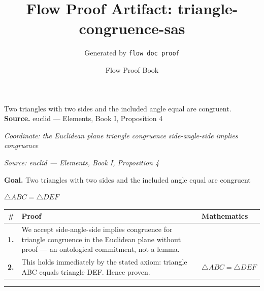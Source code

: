 \documentclass[11pt]{article}
\title{Flow Proof Artifact: triangle-congruence-sas}
\author{Generated by \texttt{flow doc proof}}
\date{Flow Proof Book}
\theoremstyle{definition}
\begin{document}
\maketitle
Two triangles with two sides and the included angle equal are congruent.\\[0.5em]
\textbf{Source.} euclid — Elements, Book I, Proposition 4\\[0.5em]
\bigskip
{}\par
\smallskip\noindent\textit{Coordinate: the Euclidean plane \cdot triangle congruence \cdot side-angle-side implies congruence}\par
\smallskip\noindent\textit{Source: euclid — Elements, Book I, Proposition 4}\par
\medskip
\noindent\textbf{Goal.} Two triangles with two sides and the included angle equal are congruent\par
\noindent$\displaystyle \triangle ABC = \triangle DEF$\par
\medskip
\noindent
\begin{tabular}{@{} >{\raggedright\arraybackslash}p{} >{\raggedright\arraybackslash}p{} >{\raggedleft\arraybackslash}p{} @{}}
\textbf{\#} & \textbf{Proof} & \textbf{Mathematics} \\
\midrule
\textbf{1.} & We accept side-angle-side implies congruence for triangle congruence in the Euclidean plane without proof — an ontological commitment, not a lemma. & \\[0.45em]
\textbf{2.} & This holds immediately by the stated axiom: triangle ABC equals triangle DEF. Hence proven. & $\displaystyle \triangle ABC = \triangle DEF$ \\[0.45em]
\bottomrule
\end{tabular}
\label{thm:Geometry-triangle congruence-side_angle_side_implies_congruence}
\par\medskip\hrule
\end{document}
